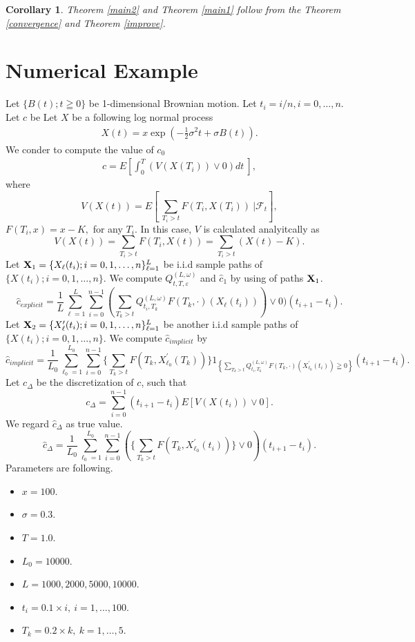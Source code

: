 \documentclass[12pt]{article}
\newtheorem{cor}[thm]{Corollary}%
\begin{document}
\begin{cor}

Theorem \ref{main2} and
Theorem \ref{main1} follow from the Theorem \ref{convergence} and Theorem \ref{improve}.

\end{cor}

\section{Numerical Example}\label{sec:nume}
Let $\{B(t); t\geqq 0\} $ be 1-dimensional Brownian motion.
Let $t_i = i/n, i=0,\ldots, n.$ Let $c$ be
Let $X$ be a following log normal process 
\begin{align}
  X(t) = x \exp\left( - \frac{1}{2} \sigma^2 t + \sigma B(t)  \right).
\end{align}
We conder to compute the value of $c_0$
\begin{align}
  c = E\left[\int_0^T  \left(V(X(T_i)) \vee 0 \right) dt \ \right],
\end{align}
where 
$$V(X(t)) = E\left[\ \sum_{T_i>t}F(T_i, X(T_i)) \ | \mathcal{F}_t \right],$$
$F(T_i, x) = x - K,$ for any $T_i.$
In this case, $V$ is calculated analyitcally as 
$$
V(X(t)) = \sum_{T_i>t}F(T_i, X(t)) =\sum_{T_i>t}(X(t)- K) .
$$
Let
${\bf X}_1 = \{X_{\ell }(t_i); i=0,1,\ldots,n \}_{\ell=1}^L$
be i.i.d sample paths of $\{X(t_i); i=0,1,\ldots,n\} $.
We compute
 $Q_{t,T,\varepsilon}^{(L,\omega)}$ and $\hat{c}_1$ by using of paths ${\bf X}_1$.
 $$\hat{c}_{explicit}=\frac{1}{L} \sum_{\ell=1}^L \sum_{i=0}^{n-1} \left(\sum_{T_k>t} Q_{t_i,T_k}^{(L,\omega)}F(T_k, \cdot)(X_{\ell}(t_i))\right)\vee0)(t_{i+1}-t_i). $$
Let ${\bf X}_2 = \{X'_{\ell }(t_i); i=0,1,\ldots,n \}_{\ell=1}^L$
be another i.i.d sample paths of $\{X(t_i); i=0,1,\ldots,n\} $.
We compute $\hat{c}_{implicit}$ by 
$$\hat{c}_{implicit}= \frac{1}{L_0} \sum_{\ell_0=1}^{L_0} \sum_{i=0}^{n-1} \{ \sum_{T_k>t}F(T_k, X_{\ell_0}^{'}(T_k))\}
1_{\left\{\sum_{T_k>t} Q_{t_i,T_k}^{(L,\omega)}F(T_k, \cdot)(X^{'}_{\ell_0}(t_i)) \geqq 0\right\}}(t_{i+1}-t_i).$$ 
Let $c_{\Delta}$ be the discretization of $c$, such that
$$
c_{\Delta}=\sum_{i=0}^{n-1}(t_{i+1}-t_i)E[V(X(t_i))\vee0].
$$
We regard $\hat{c}_{\Delta}$ as true value.
$$
\hat{c}_{\Delta} = \frac{1}{L_0} \sum_{\ell_0=1}^{L_0} \sum_{i=0}^{n-1} \left(\{ \sum_{T_k>t}F(T_k, X_{\ell_0}^{'}(t_i))\}\vee 0\right)
(t_{i+1}-t_i).
$$
Parameters are following.
\begin{itemize}
    \item $x = 100.$
    \item $\sigma = 0.3.$
    \item $T=1.0.$
    \item $L_0=10000.$ 
    \item $L=1000, 2000, 5000, 10000.$ 
    \item $t_i = 0.1 \times i, \ i = 1, \dots, 100.$
    \item $T_k = 0.2 \times k, \ k = 1, \dots, 5.$ 
\end{itemize}
\end{document}
